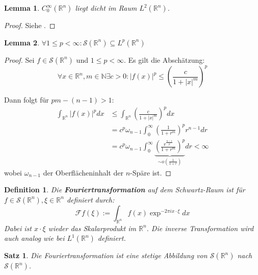 \documentclass{article}
\newcommand{\R}[0]{\mathbb{R}}
\newcommand{\N}[0]{\mathbb{N}}
\newcommand{\F}[0]{\mathcal{F}}
\newcommand{\Ssp}[0]{\mathcal{S}}
\newcommand{\C}[0]{C^{\infty}_0}
\newtheorem{defin}{Definition}
\newtheorem{lemma}{Lemma}
\newtheorem{thm}{Satz}
\begin{document}
\begin{lemma}\label{lem:C0dense}
    $\C(\R^n)$ liegt dicht im Raum $L^2(\R^n)$.
\end{lemma}

\begin{proof}
    Siehe \cite[S. 115, Satz 2.15(3)]{alt2016linear}.
\end{proof}

\begin{lemma}\label{lem:slp}
    $\forall 1 \leq p < \infty: \Ssp(\R^n) \subseteq L^p(\R^n)$
\end{lemma}

\begin{proof}\cite[S. 230f.]{werner2006funktionalanalysis}
    Sei $f \in \Ssp(\R^n)$ und $1 \leq p < \infty$. Es gilt die Abschätzung:
    \begin{equation}
        \forall x\in \R^n, m\in \N\exists c>0: |f(x)|^p \leq \left(\frac{c}{1 + |x|^m}\right)^p
    \end{equation}

    Dann folgt für $pm - (n-1) > 1$:
    \begin{align*}
        \int_{\R^n} |f(x)|^p dx &\leq \int_{\R^n} \left(\frac{c}{1 + |x|^m}\right)^p dx \\
        &= c^p \omega_{n - 1} \int_{0}^{\infty} \left(\frac{1}{1 + r^m}\right)^pr^{n - 1}dr \\
        &= c^p \omega_{n - 1} \int_{0}^{\infty} \underbrace{\left(\frac{r^{\frac{n-1}{p}}}{1 + r^m}\right)^p}_{\sim o(\frac{1}{1+r})} dr < \infty
    \end{align*}
    wobei $\omega_{n-1}$ der Oberflächeninhalt der $n$-Späre ist.
\end{proof}

\begin{defin}
    Die \textbf{Fouriertransformation} auf dem Schwartz-Raum ist für $f \in \Ssp(\R^n), \xi \in \R^n$ definiert durch:
    \begin{equation}
        \F f(\xi) := \int_{\R^n} f(x) \exp^{-2\pi i x \cdot \xi} dx
    \end{equation}
    Dabei ist $x \cdot \xi$ wieder das Skalarprodukt im $\R^n$.
    Die inverse Transformation wird auch analog wie bei $L^1(\R^n)$ definiert.
\end{defin}

\begin{thm}
    Die Fouriertransformation ist eine stetige Abbildung von $\Ssp(\R^n)$ nach $\Ssp(\R^n)$.
\end{thm}
\end{document}
